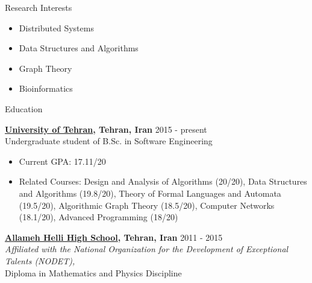 \documentclass{resume} %
\begin{document}
	

\begin{rSection}{Research Interests}
	\begin{multicols}{2}
		\begin{itemize}[leftmargin=0mm]
			\item Distributed Systems
			\item Data Structures and Algorithms
			\item Graph Theory
			\item Bioinformatics
		\end{itemize}
	\end{multicols}
\end{rSection}


\begin{rSection}{Education}
	
	{\bf \href{http://ut.ac.ir/en}{University of Tehran}, Tehran, Iran} \hfill 2015 - present
	\\Undergraduate student of B.Sc. in Software Engineering
	
	\begin{itemize}
		\item Current GPA: 17.11/20
		\item Related Courses: Design and Analysis of Algorithms (20/20), Data Structures and Algorithms (19.8/20),
		Theory of Formal Languages and Automata (19.5/20), Algorithmic Graph Theory (18.5/20), Computer Networks (18.1/20),
		Advanced Programming (18/20)
	\end{itemize}
	
	{\bf \href{http://www.helli.ir/}{Allameh Helli High School}, Tehran, Iran} \hfill 2011 - 2015
	\\\textit{\scriptsize Affiliated with the National Organization for the Development of Exceptional Talents (NODET),}
	\\Diploma in Mathematics and Physics Discipline
	
\end{rSection}

\end{document}
